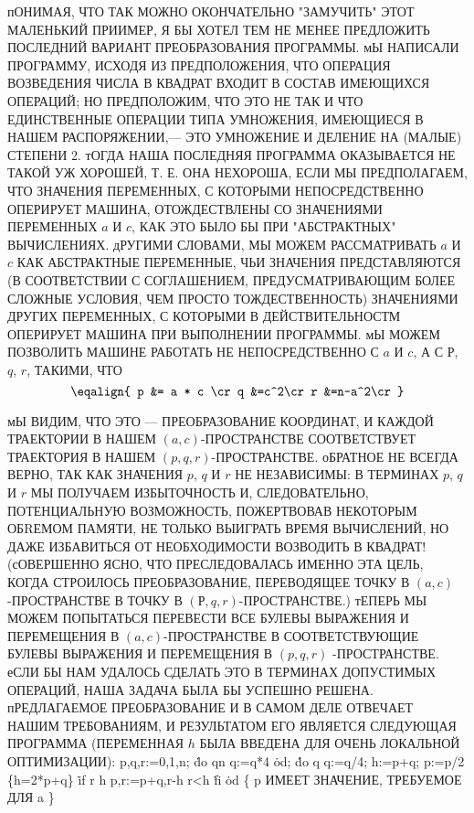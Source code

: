 пОНИМАЯ, ЧТО ТАК МОЖНО ОКОНЧАТЕЛЬНО "ЗАМУЧИТЬ" ЭТОТ МАЛЕНЬКИЙ
ПРИИМЕР, Я БЫ ХОТЕЛ ТЕМ НЕ МЕНЕЕ ПРЕДЛОЖИТЬ ПОСЛЕДНИЙ
ВАРИАНТ ПРЕОБРАЗОВАНИЯ ПРОГРАММЫ. мЫ НАПИСАЛИ ПРОГРАММУ,
ИСХОДЯ ИЗ ПРЕДПОЛОЖЕНИЯ, ЧТО ОПЕРАЦИЯ ВОЗВЕДЕНИЯ ЧИСЛА В
КВАДРАТ ВХОДИТ В СОСТАВ ИМЕЮЩИХСЯ ОПЕРАЦИЙ; НО ПРЕДПОЛОЖИМ,
ЧТО ЭТО НЕ ТАК И ЧТО ЕДИНСТВЕННЫЕ ОПЕРАЦИИ ТИПА
УМНОЖЕНИЯ, ИМЕЮЩИЕСЯ В НАШЕМ РАСПОРЯЖЕНИИ,--- ЭТО УМНОЖЕНИЕ
И ДЕЛЕНИЕ НА (МАЛЫЕ) СТЕПЕНИ 2. тОГДА НАША ПОСЛЕДНЯЯ
ПРОГРАММА ОКАЗЫВАЕТСЯ НЕ ТАКОЙ УЖ ХОРОШЕЙ, Т. Е. ОНА
НЕХОРОША, ЕСЛИ МЫ ПРЕДПОЛАГАЕМ, ЧТО ЗНАЧЕНИЯ ПЕРЕМЕННЫХ,
С КОТОРЫМИ НЕПОСРЕДСТВЕННО ОПЕРИРУЕТ МАШИНА, ОТОЖДЕСТВЛЕНЫ
СО ЗНАЧЕНИЯМИ ПЕРЕМЕННЫХ $a$ И $c$, КАК ЭТО БЫЛО БЫ ПРИ 
"АБСТРАКТНЫХ" ВЫЧИСЛЕНИЯХ. дРУГИМИ СЛОВАМИ, МЫ МОЖЕМ
РАССМАТРИВАТЬ $a$ И $c$ КАК АБСТРАКТНЫЕ ПЕРЕМЕННЫЕ, ЧЬИ
ЗНАЧЕНИЯ ПРЕДСТАВЛЯЮТСЯ (В СООТВЕТСТВИИ С СОГЛАШЕНИЕМ, 
ПРЕДУСМАТРИВАЮЩИМ БОЛЕЕ СЛОЖНЫЕ УСЛОВИЯ, ЧЕМ ПРОСТО 
ТОЖДЕСТВЕННОСТЬ)
ЗНАЧЕНИЯМИ ДРУГИХ ПЕРЕМЕННЫХ, С КОТОРЫМИ
В ДЕЙСТВИТЕЛЬНОСТМ ОПЕРИРУЕТ МАШИНА ПРИ ВЫПОЛНЕНИИ
ПРОГРАММЫ. мЫ МОЖЕМ ПОЗВОЛИТЬ МАШИНЕ РАБОТАТЬ НЕ
НЕПОСРЕДСТВЕННО С $a$ И $c$, А С $Р$, $q$, $r$, ТАКИМИ, ЧТО
$$
\eqalign{
p &= a * c \cr
q &=c^2\cr
r &=n-a^2\cr
}
$$

мЫ ВИДИМ, ЧТО ЭТО --- ПРЕОБРАЗОВАНИЕ КООРДИНАТ, И КАЖДОЙ
ТРАЕКТОРИИ В НАШЕМ $(a, c)$-ПРОСТРАНСТВЕ СООТВЕТСТВУЕТ
ТРАЕКТОРИЯ В НАШЕМ $(p, q, r)$-ПРОСТРАНСТВЕ. оБРАТНОЕ НЕ ВСЕГДА
ВЕРНО, ТАК КАК ЗНАЧЕНИЯ $p$, $q$ И $r$  НЕ НЕЗАВИСИМЫ: В ТЕРМИНАХ
$p$, $q$  И $r$ МЫ ПОЛУЧАЕМ ИЗБЫТОЧНОСТЬ И, СЛЕДОВАТЕЛЬНО,
ПОТЕНЦИАЛЬНУЮ ВОЗМОЖНОСТЬ, ПОЖЕРТВОВАВ НЕКОТОРЫМ ОБRЕМОМ
ПАМЯТИ, НЕ  ТОЛЬКО ВЫИГРАТЬ ВРЕМЯ ВЫЧИСЛЕНИЙ, НО
ДАЖЕ ИЗБАВИТЬСЯ ОТ НЕОБХОДИМОСТИ ВОЗВОДИТЬ В КВАДРАТ!
(сОВЕРШЕННО ЯСНО, ЧТО ПРЕСЛЕДОВАЛАСЬ ИМЕННО ЭТА ЦЕЛЬ,
КОГДА СТРОИЛОСЬ ПРЕОБРАЗОВАНИЕ, ПЕРЕВОДЯЩЕЕ ТОЧКУ В
$(a,c)$-ПРОСТРАНСТВЕ В ТОЧКУ В $(Р, q, r)$-ПРОСТРАНСТВЕ.) тЕПЕРЬ МЫ
МОЖЕМ ПОПЫТАТЬСЯ ПЕРЕВЕСТИ ВСЕ БУЛЕВЫ ВЫРАЖЕНИЯ И 
ПЕРЕМЕЩЕНИЯ В $(a, c)$-ПРОСТРАНСТВЕ В СООТВЕТСТВУЮЩИЕ БУЛЕВЫ
ВЫРАЖЕНИЯ И ПЕРЕМЕЩЕНИЯ В $(p, q, r)$ -ПРОСТРАНСТВЕ. еСЛИ БЫ НАМ
УДАЛОСЬ СДЕЛАТЬ ЭТО В ТЕРМИНАХ ДОПУСТИМЫХ ОПЕРАЦИЙ, НАША
ЗАДАЧА БЫЛА БЫ УСПЕШНО РЕШЕНА. пРЕДЛАГАЕМОЕ ПРЕОБРАЗОВАНИЕ
И В САМОМ ДЕЛЕ ОТВЕЧАЕТ НАШИМ ТРЕБОВАНИЯМ, И РЕЗУЛЬТАТОМ
ЕГО ЯВЛЯЕТСЯ СЛЕДУЮЩАЯ ПРОГРАММА (ПЕРЕМЕННАЯ $h$ БЫЛА
ВВЕДЕНА ДЛЯ ОЧЕНЬ ЛОКАЛЬНОЙ ОПТИМИЗАЦИИ):
\prg
p,q,r:=0,1,n; \.{do} q\LE n \TO q:=q*4 \.{od};
\.{do} q \TO q:=q/4; h:=p+q; p:=p/2 \{h=2*p+q\}
     \.{if} r \GE h \TO p,r:=p+q,r-h
       \wbox r<h \TO {}
     \.{fi}
\.{od} \{ p ИМЕЕТ ЗНАЧЕНИЕ, ТРЕБУЕМОЕ ДЛЯ a \}
\grp

